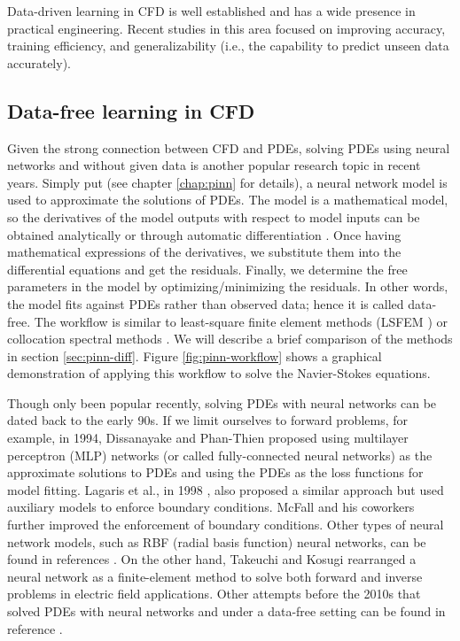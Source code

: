 Data-driven learning in CFD is well established and has a wide presence in practical engineering.
Recent studies in this area focused on improving accuracy, training efficiency, and generalizability (i.e., the capability to predict unseen data accurately).

\subsection*{Data-free learning in CFD}

Given the strong connection between CFD and PDEs, solving PDEs using neural networks and without given data is another popular research topic in recent years.
Simply put (see chapter \ref{chap:pinn} for details), a neural network model is used to approximate the solutions of PDEs.
The model is a mathematical model, so the derivatives of the model outputs with respect to model inputs can be obtained analytically or through automatic differentiation \cite{griewank_automatic_1988}.
Once having mathematical expressions of the derivatives, we substitute them into the differential equations and get the residuals. 
Finally, we determine the free parameters in the model by optimizing/minimizing the residuals.
In other words, the model fits against PDEs rather than observed data; hence it is called data-free.
The workflow is similar to least-square finite element methods (LSFEM \cite{jiang_least-squares_1998}) or collocation spectral methods \cite{trefethen_spectral_2000}.
We will describe a brief comparison of the methods in section \ref{sec:pinn-diff}.
Figure \ref{fig:pinn-workflow} shows a graphical demonstration of applying this workflow to solve the Navier-Stokes equations. 

Though only been popular recently, solving PDEs with neural networks can be dated back to the early 90s.
If we limit ourselves to forward problems, for example, in 1994, Dissanayake and Phan-Thien \cite{dissanayake_neural-network-based_1994} proposed using multilayer perceptron (MLP) networks (or called fully-connected neural networks) as the approximate solutions to PDEs and using the PDEs as the loss functions for model fitting.
Lagaris et al., in 1998 \cite{lagaris_artificial_1998}, also proposed a similar approach but used auxiliary models to enforce boundary conditions.
McFall and his coworkers \cite{McFall2009,mcfall_solving_2010} further improved the enforcement of boundary conditions.
Other types of neural network models, such as RBF (radial basis function) neural networks, can be found in references \cite{li_numerical_2003,mai-duy_numerical_2001,demirkaya_direct_2008,li_integration_2010}.
On the other hand, Takeuchi and Kosugi \cite{takeuchi_neural_1994} rearranged a neural network as a finite-element method to solve both forward and inverse problems in electric field applications.
Other attempts before the 2010s that solved PDEs with neural networks and under a data-free setting can be found in reference \cite{yadav_introduction_2015}.

